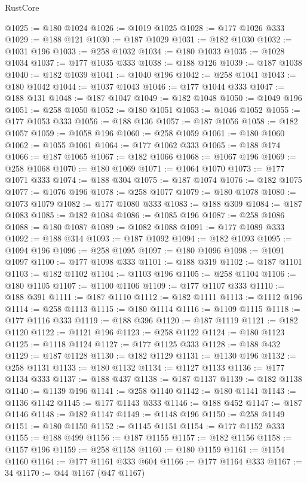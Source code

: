 \begin{lexlean}{RustCore}
\begin{coremodule}
@1025 := @180 @1024
@1026 := @1019 @1025
@1028 := @177 @1026 @333
@1029 := @188 @121
@1030 := @187 @1029
@1031 := @182 @1030
@1032 := @1031 @196
@1033 := @258 @1032
@1034 := @180 @1033
@1035 := @1028 @1034
@1037 := @177 @1035 @333
@1038 := @188 @126
@1039 := @187 @1038
@1040 := @182 @1039
@1041 := @1040 @196
@1042 := @258 @1041
@1043 := @180 @1042
@1044 := @1037 @1043
@1046 := @177 @1044 @333
@1047 := @188 @131
@1048 := @187 @1047
@1049 := @182 @1048
@1050 := @1049 @196
@1051 := @258 @1050
@1052 := @180 @1051
@1053 := @1046 @1052
@1055 := @177 @1053 @333
@1056 := @188 @136
@1057 := @187 @1056
@1058 := @182 @1057
@1059 := @1058 @196
@1060 := @258 @1059
@1061 := @180 @1060
@1062 := @1055 @1061
@1064 := @177 @1062 @333
@1065 := @188 @174
@1066 := @187 @1065
@1067 := @182 @1066
@1068 := @1067 @196
@1069 := @258 @1068
@1070 := @180 @1069
@1071 := @1064 @1070
@1073 := @177 @1071 @333
@1074 := @188 @304
@1075 := @187 @1074
@1076 := @182 @1075
@1077 := @1076 @196
@1078 := @258 @1077
@1079 := @180 @1078
@1080 := @1073 @1079
@1082 := @177 @1080 @333
@1083 := @188 @309
@1084 := @187 @1083
@1085 := @182 @1084
@1086 := @1085 @196
@1087 := @258 @1086
@1088 := @180 @1087
@1089 := @1082 @1088
@1091 := @177 @1089 @333
@1092 := @188 @314
@1093 := @187 @1092
@1094 := @182 @1093
@1095 := @1094 @196
@1096 := @258 @1095
@1097 := @180 @1096
@1098 := @1091 @1097
@1100 := @177 @1098 @333
@1101 := @188 @319
@1102 := @187 @1101
@1103 := @182 @1102
@1104 := @1103 @196
@1105 := @258 @1104
@1106 := @180 @1105
@1107 := @1100 @1106
@1109 := @177 @1107 @333
@1110 := @188 @391
@1111 := @187 @1110
@1112 := @182 @1111
@1113 := @1112 @196
@1114 := @258 @1113
@1115 := @180 @1114
@1116 := @1109 @1115
@1118 := @177 @1116 @333
@1119 := @188 @396
@1120 := @187 @1119
@1121 := @182 @1120
@1122 := @1121 @196
@1123 := @258 @1122
@1124 := @180 @1123
@1125 := @1118 @1124
@1127 := @177 @1125 @333
@1128 := @188 @432
@1129 := @187 @1128
@1130 := @182 @1129
@1131 := @1130 @196
@1132 := @258 @1131
@1133 := @180 @1132
@1134 := @1127 @1133
@1136 := @177 @1134 @333
@1137 := @188 @437
@1138 := @187 @1137
@1139 := @182 @1138
@1140 := @1139 @196
@1141 := @258 @1140
@1142 := @180 @1141
@1143 := @1136 @1142
@1145 := @177 @1143 @333
@1146 := @188 @452
@1147 := @187 @1146
@1148 := @182 @1147
@1149 := @1148 @196
@1150 := @258 @1149
@1151 := @180 @1150
@1152 := @1145 @1151
@1154 := @177 @1152 @333
@1155 := @188 @499
@1156 := @187 @1155
@1157 := @182 @1156
@1158 := @1157 @196
@1159 := @258 @1158
@1160 := @180 @1159
@1161 := @1154 @1160
@1164 := @177 @1161 @333 @604
@1166 := @177 @1164 @333
@1167 := 34
@1170 := @44 @1167 (@47 @1167)

\end{coremodule}
\end{lexlean}
